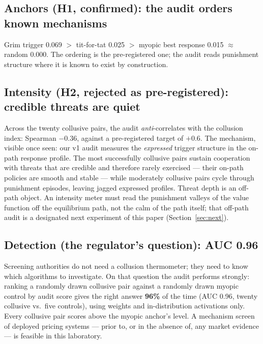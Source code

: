 \documentclass[11pt]{article}
\begin{document}
\subsection{Anchors (H1, confirmed): the audit orders known mechanisms}
Grim trigger 0.069 $>$ tit-for-tat 0.025 $>$ myopic best response 0.015
$\approx$ random 0.000. The ordering is the pre-registered one; the audit
reads punishment structure where it is known to exist by construction.

\subsection{Intensity (H2, rejected as pre-registered): credible threats
are quiet}
Across the twenty collusive pairs, the audit \emph{anti}-correlates with
the collusion index: Spearman $\mathbf{-0.36}$, against a pre-registered
target of $+0.6$. The mechanism, visible once seen: our v1 audit measures
the \emph{expressed} trigger structure in the on-path response profile.
The most successfully collusive pairs sustain cooperation with threats
that are credible and therefore rarely exercised --- their on-path
policies are smooth and stable --- while moderately collusive pairs cycle
through punishment episodes, leaving jagged expressed profiles. Threat
depth is an off-path object. An intensity meter must read the punishment
valleys of the value function off the equilibrium path, not the calm of
the path itself; that off-path audit is a designated next experiment of
this paper (Section~\ref{sec:next}).

\subsection{Detection (the regulator's question): AUC 0.96}
Screening authorities do not need a collusion thermometer; they need to
know which algorithms to investigate. On that question the audit performs
strongly: ranking a randomly drawn collusive pair against a randomly drawn
myopic control by audit score gives the right answer \textbf{96\%} of the
time (AUC 0.96, twenty collusive vs.\ five controls), using weights and
in-distribution activations only. Every collusive pair scores above the
myopic anchor's level. A mechanism screen of deployed pricing systems ---
prior to, or in the absence of, any market evidence --- is feasible in
this laboratory.
\end{document}

